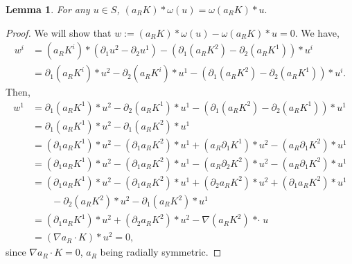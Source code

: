 \documentclass[reqno,openright,11pt,twoside]{amsart}
\newtheorem{lemma}[theorem]{Lemma}
\theoremstyle{definition}
\numberwithin{equation}{section}
\begin{document}
\begin{lemma}\label{L:AlmostBSu}
	For any $u \in S$,
	$
		(a_R K) * \omega(u)
			= \omega(a_R K) * u.
	$
\end{lemma}
\begin{proof}
	
	
	
	

	We will show that $w := (a_R K) * \omega(u) - \omega(a_R K) * u = 0$.
	We have,
	\begin{align*}
		w^i
			&= (a_R K^i) * ({\ensuremath{\partial}}_1 u^2 - {\ensuremath{\partial}}_2 u^1)
				- ({\ensuremath{\partial}}_1 (a_R K^2) - {\ensuremath{\partial}}_2 (a_R K^1)) * u^i \\
			&= {\ensuremath{\partial}}_1 (a_R K^i) * u^2 - {\ensuremath{\partial}}_2 (a_R K^i) * u^1
				- ({\ensuremath{\partial}}_1 (a_R K^2) - {\ensuremath{\partial}}_2 (a_R K^1)) * u^i.
	\end{align*}
	Then,
	\begin{align*}
		w^1
			&= {\ensuremath{\partial}}_1 (a_R K^1) * u^2 - {\ensuremath{\partial}}_2 (a_R K^1) * u^1
				- ({\ensuremath{\partial}}_1 (a_R K^2) - {\ensuremath{\partial}}_2 (a_R K^1)) * u^1 \\
			&= {\ensuremath{\partial}}_1 (a_R K^1) * u^2  - {\ensuremath{\partial}}_1 (a_R K^2) * u^1 \\
			&= ({\ensuremath{\partial}}_1 a_R K^1) * u^2  - ({\ensuremath{\partial}}_1 a_R K^2) * u^1
			    + (a_R {\ensuremath{\partial}}_1 K^1) * u^2  - (a_R {\ensuremath{\partial}}_1 K^2) * u^1 \\
			&= ({\ensuremath{\partial}}_1 a_R K^1) * u^2  - ({\ensuremath{\partial}}_1 a_R K^2) * u^1
			        - (a_R {\ensuremath{\partial}}_2 K^2) * u^2  - (a_R {\ensuremath{\partial}}_1 K^2) * u^1 \\
			&= ({\ensuremath{\partial}}_1 a_R K^1) * u^2  - ({\ensuremath{\partial}}_1 a_R K^2) * u^1
			        + ({\ensuremath{\partial}}_2 a_R K^2) * u^2  + ({\ensuremath{\partial}}_ 1 a_R K^2) * u^1 \\
			&\qquad
				- {\ensuremath{\partial}}_2 (a_R K^2) * u^2  - {\ensuremath{\partial}}_ 1 (a_R K^2) * u^1 \\
			&= ({\ensuremath{\partial}}_1 a_R K^1) * u^2 + ({\ensuremath{\partial}}_2 a_R K^2) * u^2
			    - {\ensuremath{\nabla}} (a_R K^2) {\mathop{* \cdot}} u \\
			&= ({\ensuremath{\nabla}} a_R \cdot K) * u^2
			= 0,
	\end{align*}
	since ${\ensuremath{\nabla}} a_R \cdot K = 0$, $a_R$ being radially symmetric.

\end{proof}
\end{document}
